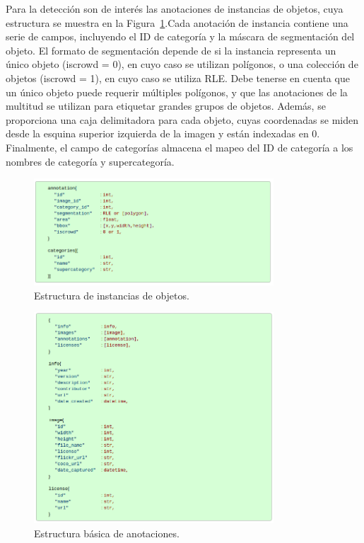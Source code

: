 Para la detección son de interés las anotaciones de instancias de objetos, cuya estructura se muestra en la Figura~\ref{fig.objInst}.Cada anotación de instancia contiene una serie de campos, incluyendo el ID de categoría y la máscara de segmentación del objeto. El formato de segmentación depende de si la instancia representa un único objeto (iscrowd = 0), en cuyo caso se utilizan polígonos, o una colección de objetos (iscrowd = 1), en cuyo caso se utiliza RLE. Debe tenerse en cuenta que un único objeto puede requerir múltiples polígonos, y que las anotaciones de la multitud se utilizan para etiquetar grandes grupos de objetos. Además, se proporciona una caja delimitadora para cada objeto, cuyas coordenadas se miden desde la esquina superior izquierda de la imagen y están indexadas en 0. Finalmente, el campo de categorías  almacena el mapeo del ID de categoría a los nombres de categoría y supercategoría.
\begin{figure}[H]
	\begin{center}
		\includegraphics[width=0.8\textwidth]{figures/instancia_objetos.png}
		\caption{Estructura de instancias de objetos.}
		\label{fig.objInst}
	\end{center}
\end{figure}

\begin{figure}[H]
	\begin{center}
		\includegraphics[width=0.8\textwidth]{figures/basic_structure_annotations.png}
		\caption{Estructura básica de anotaciones.}
		\label{fig.basicStruc}
	\end{center}
\end{figure} 

